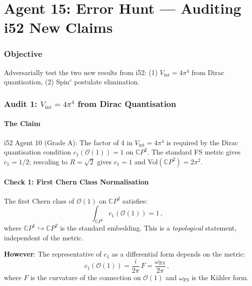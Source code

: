 \documentclass[11pt,a4paper]{article}
\newcommand{\CP}{\mathbb{C}P}
\begin{document}
\part{Agent 15: Error Hunt --- Auditing i52 New Claims}
\label{part:errors}

\section{Objective}

Adversarially test the two new results from i52: (1) $V_{\mathrm{int}} = 4\pi^4$ from Dirac quantisation, (2) Spin$^c$ postulate elimination.

\section{Audit 1: $V_{\mathrm{int}} = 4\pi^4$ from Dirac Quantisation}

\subsection{The Claim}

i52 Agent 10 (Grade A): The factor of 4 in $V_{\mathrm{int}} = 4\pi^4$ is required by the Dirac quantisation condition $c_1(\mathcal{O}(1)) = 1$ on $\CP^2$. The standard FS metric gives $c_1 = 1/2$; rescaling to $R = \sqrt{2}$ gives $c_1 = 1$ and Vol$(\CP^2) = 2\pi^2$.

\subsection{Check 1: First Chern Class Normalisation}

The first Chern class of $\mathcal{O}(1)$ on $\CP^2$ satisfies:
\begin{equation}
\int_{\CP^1} c_1(\mathcal{O}(1)) = 1\,,
\end{equation}
where $\CP^1 \hookrightarrow \CP^2$ is the standard embedding. This is a \emph{topological} statement, independent of the metric.

\textbf{However}: The representative of $c_1$ as a differential form depends on the metric:
\begin{equation}
c_1(\mathcal{O}(1)) = \frac{i}{2\pi}\,F = \frac{\omega_{\mathrm{FS}}}{2\pi}\,,
\end{equation}
where $F$ is the curvature of the connection on $\mathcal{O}(1)$ and $\omega_{\mathrm{FS}}$ is the K\"ahler form.
\end{document}
